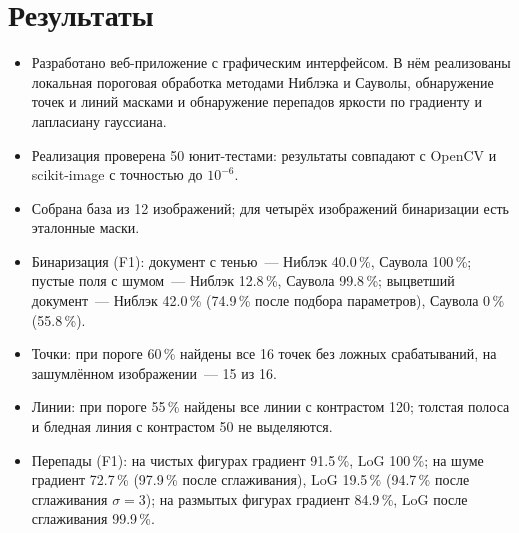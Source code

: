 \documentclass[11pt,a4paper]{article}
\begin{document}
\section{Результаты}
\begin{itemize}[label=--, leftmargin=1.5em, itemsep=0.2em, topsep=0.2em]
  \item Разработано веб-приложение с графическим интерфейсом. В нём реализованы
        локальная пороговая обработка методами Ниблэка и Сауволы, обнаружение
        точек и линий масками и обнаружение перепадов яркости по градиенту и
        лапласиану гауссиана.
  \item Реализация проверена 50 юнит-тестами: результаты совпадают с OpenCV и
        scikit-image с точностью до $10^{-6}$.
  \item Собрана база из 12 изображений; для четырёх изображений бинаризации
        есть эталонные маски.
  \item Бинаризация (F1): документ с тенью~— Ниблэк 40.0\,\%, Саувола
        100\,\%; пустые поля с шумом~— Ниблэк 12.8\,\%, Саувола 99.8\,\%;
        выцветший документ~— Ниблэк 42.0\,\% (74.9\,\% после подбора
        параметров), Саувола 0\,\% (55.8\,\%).
  \item Точки: при пороге 60\,\% найдены все 16 точек без ложных
        срабатываний, на зашумлённом изображении~— 15 из 16.
  \item Линии: при пороге 55\,\% найдены все линии с контрастом 120; толстая
        полоса и бледная линия с контрастом 50 не выделяются.
  \item Перепады (F1): на чистых фигурах градиент 91.5\,\%, LoG 100\,\%; на
        шуме градиент 72.7\,\% (97.9\,\% после сглаживания), LoG 19.5\,\%
        (94.7\,\% после сглаживания $\sigma = 3$); на размытых фигурах
        градиент 84.9\,\%, LoG после сглаживания 99.9\,\%.
\end{itemize}
\end{document}
